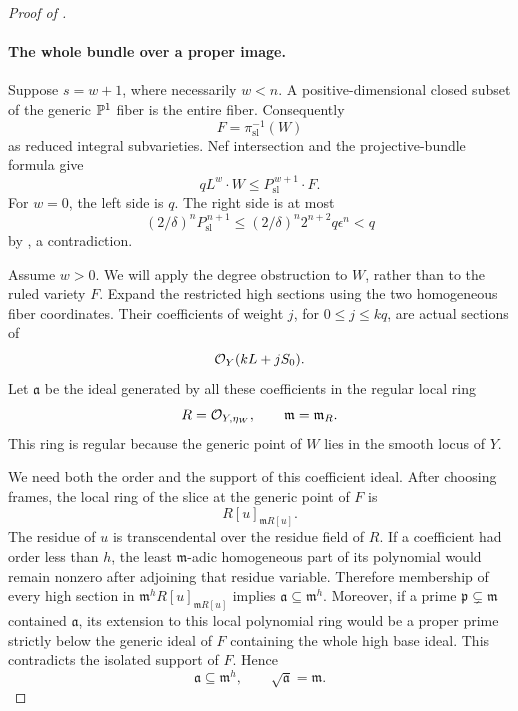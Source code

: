 \begin{proof}[Proof of ]
\paragraph{The whole bundle over a proper image.}
Suppose \(s=w+1\), where necessarily \(w<n\). A positive-dimensional
closed subset of the generic \(\mathbb P^1\) fiber is the entire fiber.
Consequently
\[
 F=\pi_{\mathrm{sl}}^{-1}(W)
\]
as reduced integral subvarieties. Nef intersection and the
projective-bundle formula give
\begin{equation}\label{eq:whole-bundle-base-volume}
 qL^w\cdot W\le P_{\mathrm{sl}}^{\,w+1}\cdot F .
\end{equation}
For \(w=0\), the left side is \(q\). The right side is at most
\[
 (2/\delta)^nP_{\mathrm{sl}}^{\,n+1}
 \le(2/\delta)^n2^{n+2}q\epsilon^n<q
\]
by , a contradiction.

Assume \(w>0\). We will apply the degree obstruction to \(W\), rather
than to the ruled variety \(F\). Expand the restricted high sections
using the two homogeneous fiber coordinates. Their coefficients of
weight \(j\), for \(0\le j\le kq\), are actual sections of
\[
 \mathcal O_Y(kL+jS_0).
\]
Let \(\mathfrak a\) be the ideal generated by all these coefficients
in the regular local ring
\[
 R=\mathcal O_{Y,\eta_W},\qquad \mathfrak m=\mathfrak m_R.
\]
This ring is regular because the generic point of \(W\) lies in the
smooth locus of \(Y\).

We need both the order and the support of this coefficient ideal.
After choosing frames, the local ring of the slice at the generic
point of \(F\) is
\[
 R[u]_{\mathfrak m R[u]} .
\]
The residue of \(u\) is transcendental over the residue field of
\(R\). If a coefficient had order less than \(h\), the least
\(\mathfrak m\)-adic homogeneous part of its polynomial would remain
nonzero after adjoining that residue variable. Therefore membership
of every high section in
\(\mathfrak m^hR[u]_{\mathfrak m R[u]}\) implies
\(\mathfrak a\subseteq\mathfrak m^h\).
Moreover, if a prime \(\mathfrak p\subsetneq\mathfrak m\) contained
\(\mathfrak a\), its extension to this local polynomial ring would
be a proper prime strictly below the generic ideal of \(F\)
containing the whole high base ideal. This contradicts the isolated
support of \(F\). Hence
\begin{equation}\label{eq:two-slot-coefficient-ideal}
 \mathfrak a\subseteq\mathfrak m^h,\qquad
 \sqrt{\mathfrak a}=\mathfrak m .
\end{equation}


\end{proof}

